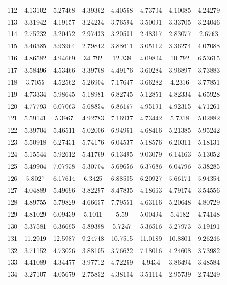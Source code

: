 \begin{center}
\begin{longtable}{cccccccc}
112 & 4.13102 & 5.27468 & 4.39362 & 4.40568 & 4.73704 & 4.10085 & 4.24279\\
113 & 3.31942 & 4.19157 & 3.24234 & 3.76594 & 3.50091 & 3.33705 & 3.24046\\
114 & 2.75232 & 3.20472 & 2.97433 & 3.20501 & 2.48317 & 2.83077 & 2.6763\\
115 & 3.46385 & 3.93964 & 2.79842 & 3.88611 & 3.05112 & 3.36274 & 4.07088\\
116 & 4.86582 & 4.94669 & 34.792 & 12.338 & 4.09804 & 10.792 & 6.53615\\
117 & 3.58496 & 4.53466 & 3.39768 & 4.49176 & 3.60284 & 3.96897 & 3.73883\\
118 & 3.7055 & 4.52562 & 5.26904 & 7.17647 & 3.66282 & 4.2316 & 3.77851\\
119 & 4.73334 & 5.98645 & 5.18981 & 6.82745 & 5.12851 & 4.82334 & 4.65928\\
120 & 4.77793 & 6.07063 & 5.68854 & 6.86167 & 4.95191 & 4.92315 & 4.71261\\
121 & 5.59141 & 5.3967 & 4.92783 & 7.16937 & 4.73442 & 5.7318 & 5.02882\\
122 & 5.39704 & 5.46511 & 5.02006 & 6.94961 & 4.68416 & 5.21385 & 5.95242\\
123 & 5.50918 & 6.27431 & 5.74176 & 6.04537 & 5.18576 & 6.20311 & 5.18131\\
124 & 5.15544 & 5.92612 & 5.41769 & 6.13495 & 9.03079 & 6.14163 & 5.13052\\
125 & 5.49904 & 7.07938 & 5.30704 & 5.69656 & 6.37686 & 6.04796 & 5.38285\\
126 & 5.8027 & 6.17614 & 6.3425 & 6.88505 & 6.20927 & 5.66171 & 5.94354\\
127 & 4.04889 & 5.49696 & 3.82297 & 8.47835 & 4.18663 & 4.79174 & 3.54556\\
128 & 4.89755 & 5.79829 & 4.66657 & 7.79551 & 4.63116 & 5.20648 & 4.80729\\
129 & 4.81029 & 6.09439 & 5.1011 & 5.59 & 5.00494 & 5.4182 & 4.74148\\
130 & 5.37581 & 6.36695 & 5.89398 & 5.7247 & 5.36516 & 5.27973 & 5.19191\\
131 & 11.2919 & 12.5987 & 9.24748 & 10.7515 & 11.0189 & 10.8801 & 9.26246\\
132 & 3.71152 & 4.73026 & 3.88105 & 3.76622 & 7.18016 & 4.24608 & 3.73982\\
133 & 4.41089 & 4.34477 & 3.97712 & 4.72269 & 4.9434 & 3.86494 & 3.48584\\
134 & 3.27107 & 4.05679 & 2.75852 & 4.38104 & 3.51114 & 2.95739 & 2.74249\\

\end{longtable}
\end{center}
